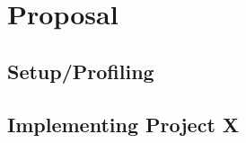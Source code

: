 \documentclass{article}
\begin{document}


\section*{Proposal}

\subsection*{Setup/Profiling}


\subsection*{Implementing Project X}

\end{document}
